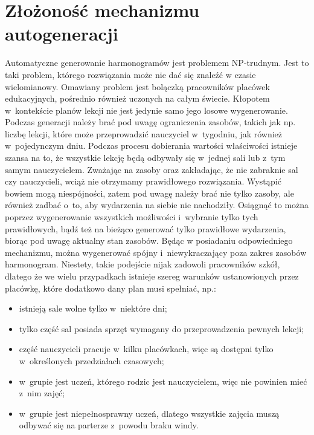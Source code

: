 \documentclass[a4paper]{book}
\begin{document}
\section{Złożoność mechanizmu autogeneracji}
Automatyczne generowanie harmonogramów jest problemem NP-trudnym. Jest to taki problem, którego rozwiązania może nie dać się znaleźć w czasie wielomianowy. Omawiany problem jest bolączką pracowników placówek edukacyjnych, pośrednio również uczonych na całym świecie. Kłopotem w~kontekście planów lekcji nie jest jedynie samo jego losowe wygenerowanie. Podczas generacji należy brać pod uwagę ograniczenia zasobów, takich jak np. liczbę lekcji, które może przeprowadzić nauczyciel w~tygodniu, jak również w~pojedynczym dniu. Podczas procesu dobierania wartości właściwości istnieje szansa na to, że wszystkie lekcję będą odbywały się w~jednej sali lub z~tym samym nauczycielem. Zważając na zasoby oraz zakładając, że nie zabraknie sal czy nauczycieli, wciąż nie otrzymamy prawidłowego rozwiązania. Wystąpić bowiem mogą niespójności, zatem pod uwagę należy brać nie tylko zasoby, ale również zadbać o~to, aby wydarzenia na siebie nie nachodziły. Osiągnąć to można poprzez wygenerowanie wszystkich możliwości i~wybranie tylko tych prawidłowych, bądź też na bieżąco generować tylko prawidłowe wydarzenia, biorąc pod uwagę aktualny stan zasobów. Będąc w posiadaniu odpowiedniego mechanizmu, można wygenerować spójny i~niewykraczający poza zakres zasobów harmonogram. Niestety, takie podejście nijak zadowoli pracowników szkół, dlatego że we wielu przypadkach istnieje szereg warunków ustanowionych przez placówkę, które dodatkowo dany plan musi spełniać, np.:
\begin{itemize}
	\item istnieją sale wolne tylko w~niektóre dni;
	\item tylko część sal posiada sprzęt wymagany do przeprowadzenia pewnych lekcji;
	\item część nauczycieli pracuje w~kilku placówkach, więc są dostępni tylko w~określonych przedziałach czasowych;
	\item w~grupie jest uczeń, którego rodzic jest nauczycielem, więc nie powinien mieć z~nim zajęć;
	\item w~grupie jest niepełnosprawny uczeń, dlatego wszystkie zajęcia muszą odbywać się na parterze z~powodu braku windy.
\end{itemize}
\end{document}
